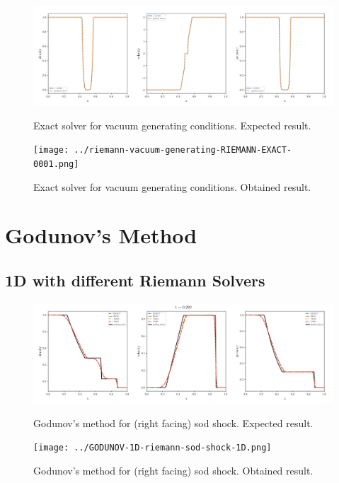     \begin{figure}[htbp]
        \centering
        \includegraphics[width=.9\textwidth]{./figures/riemann-vacuum-generating-RIEMANN-EXACT-overplotted.png}%
        \caption{Exact solver for vacuum generating conditions. Expected result.}
        \texttt{[image: ../riemann-vacuum-generating-RIEMANN-EXACT-0001.png]}%
        \caption{Exact solver for vacuum generating conditions. Obtained result.}
    \end{figure}












\clearpage
\section{Godunov's Method}

\subsection{1D with different Riemann Solvers}

    \begin{figure}[htbp]
        \centering
        \includegraphics[width=.9\textwidth]{./figures/GODUNOV-riemann-sod-shock-1D.png}%
        \caption{Godunov's method for (right facing) sod shock. Expected result.}
        \texttt{[image: ../GODUNOV-1D-riemann-sod-shock-1D.png]}%
        \caption{Godunov's method for (right facing) sod shock. Obtained result.}
    \end{figure}


